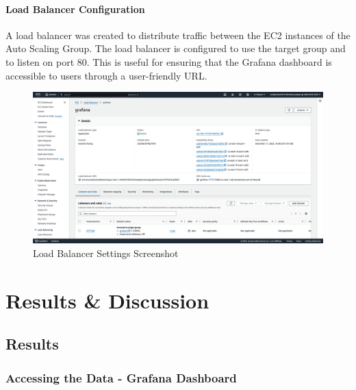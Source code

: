 \documentclass[12pt,oneside]{book} %
\begin{document}
\newpage
\subsubsection{Load Balancer Configuration}
A load balancer was created to distribute traffic between the EC2 instances of
the Auto Scaling Group. The load balancer is configured to use the target group
and to listen on port 80. This is useful for ensuring that the Grafana
dashboard is accessible to users through a user-friendly URL.
\begin{figure}[H]
    \centering
    \includegraphics[width=1\linewidth]{images/load-balancer.png}
    \caption{Load Balancer Settings Screenshot}\label{fig:load-balancer-settings}
\end{figure}

\newpage
\chapter{Results \& Discussion}

\section{Results}
\subsection{Accessing the Data - Grafana Dashboard}
\end{document}
